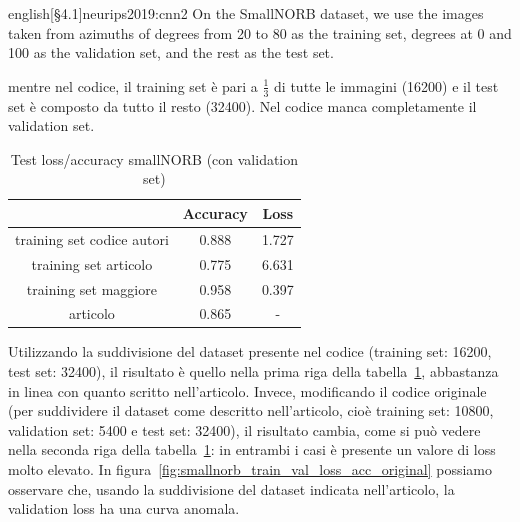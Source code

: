 \documentclass[italian,12pt,a4paper,oneside,final]{report}
\begin{document}
\begin{foreigndisplaycquote}{english}[\S4.1]{neurips2019:cnn2}
On the SmallNORB dataset, we use the images taken from azimuths of degrees from 20 to 80 as the training set, degrees at 0 and 100 as the validation set, and the rest as the test set.
\end{foreigndisplaycquote}
mentre nel codice, il training set è pari a \(\frac{1}{3}\) di tutte le immagini (16200) e il test set è composto da tutto il resto (32400).
Nel codice manca completamente il validation set.
\begin{table}[!ht]
	\centering
	\begin{tabular}[t]{|c|cc|}
		\hline
		& \textbf{Accuracy} & \textbf{Loss} \\
		\hline
		training set codice autori& 0.888 & 1.727 \\
		training set articolo& 0.775 & 6.631 \\
		training set maggiore& 0.958 & 0.397 \\
		articolo & 0.865 & - \\ 
		\hline
	\end{tabular}
	\caption{Test loss/accuracy smallNORB (con validation set)}
	\label{tab:smallnorb_val_loss_acc}
\end{table}

\noindent Utilizzando la suddivisione del dataset presente nel codice (training set: 16200, test set: 32400), il risultato è quello nella prima riga della tabella~\ref{tab:smallnorb_val_loss_acc}, abbastanza in linea con quanto scritto nell'articolo.
Invece, modificando il codice originale (per suddividere il dataset come descritto nell'articolo, cioè training set: 10800, validation set: 5400 e test set: 32400), il risultato cambia, come si può vedere nella seconda riga della tabella~\ref{tab:smallnorb_val_loss_acc}: in entrambi i casi è presente un valore di loss molto elevato.
In figura~\ref{fig:smallnorb_train_val_loss_acc_original} possiamo osservare che, usando la suddivisione del dataset indicata nell'articolo, la validation loss ha una curva anomala.
\end{document}
